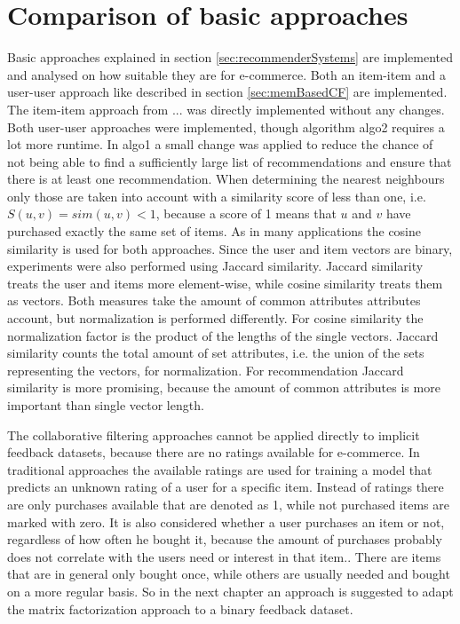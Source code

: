 \documentclass[10pt]{reportMaster}
\begin{document}
\section{Comparison of basic approaches}
\label{sec:comparison}
Basic approaches explained in section \ref{sec:recommenderSystems} are implemented and analysed on how suitable they are for e-commerce.
Both an item-item and a user-user approach like described in section \ref{sec:memBasedCF} are implemented.
The item-item approach from ... was directly implemented without any changes. %
Both user-user approaches were implemented, though algorithm algo2 requires a lot more runtime. %
In algo1 a small change was applied to reduce the chance of not being able to find a sufficiently large list of recommendations and ensure that there is at least one recommendation.
When determining the nearest neighbours only those are taken into account with a similarity score of less than one, i.e. $S(u,v) = sim(u, v) < 1$, because a score of 1 means that $u$ and $v$ have purchased exactly the same set of items.
As in many applications the cosine similarity is used for both approaches.
Since the user and item vectors are binary, experiments were also performed using Jaccard similarity.
Jaccard similarity treats the user and items more element-wise, while cosine similarity treats them as vectors.
Both measures take the amount of common attributes attributes account, but normalization is performed differently.
For cosine similarity the normalization factor is the product of the lengths of the single vectors.
Jaccard similarity counts the total amount of set attributes, i.e. the union of the sets representing the vectors, for normalization.
For recommendation Jaccard similarity is more promising, because the amount of common attributes is more important than single vector length.

The collaborative filtering approaches cannot be applied directly to implicit feedback datasets, because there are no ratings available for e-commerce.
In traditional approaches the available ratings are used for training a model that predicts an unknown rating of a user for a specific item.
Instead of ratings there are only purchases available that are denoted as 1, while not purchased items are marked with zero.
It is also considered whether a user purchases an item or not, regardless of how often he bought it, because the amount of purchases probably does not correlate with the users need or interest in that item..
There are items that are in general only bought once, while others are usually needed and bought on a more regular basis. 
So in the next chapter an approach is suggested to adapt the matrix factorization approach to a binary feedback dataset.
\end{document}
